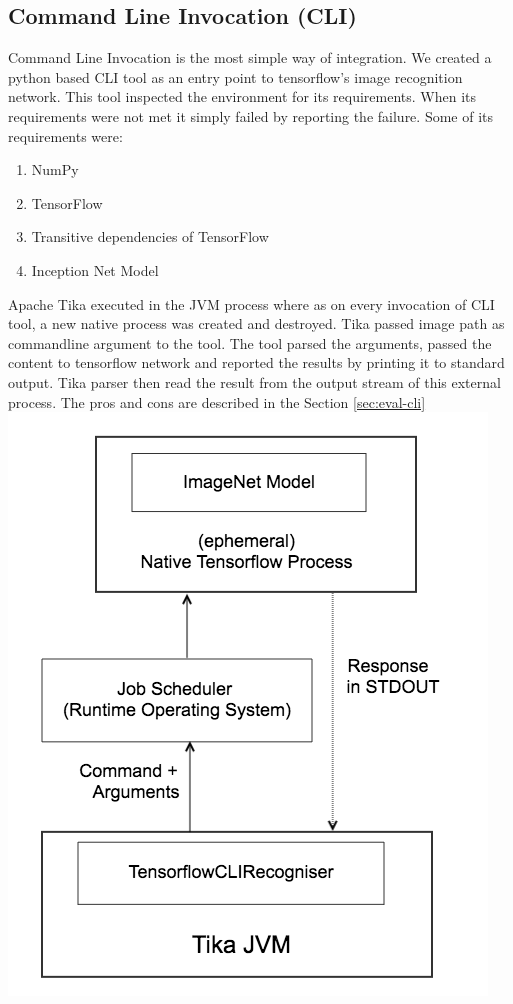 \documentclass[letterpaper, 10 pt, conference]{ieeeconf}  %
\begin{document}
\subsection{Command Line Invocation (CLI)} \label{sec:int-cli}
Command Line Invocation is the most simple way of integration. We created a python based CLI tool as an entry point to tensorflow's image recognition network. This tool inspected the environment for its requirements. When its requirements were not met it simply failed by reporting the failure. Some of its requirements were:
\begin{enumerate}
\item NumPy
\item TensorFlow
\item Transitive dependencies of TensorFlow
\item Inception Net Model
\end{enumerate}
Apache Tika executed in the JVM process where as on every invocation of CLI tool, a new native process was created and destroyed.  Tika passed image path as commandline argument to the tool. The tool parsed the arguments, passed the content to tensorflow network and reported the results by printing it to standard output.  Tika parser then read the result from the output stream of this external process. The pros and cons are described in the Section \ref{sec:eval-cli}
\includegraphics[scale=0.40]{tika-tflow-cli-design}
\end{document}
